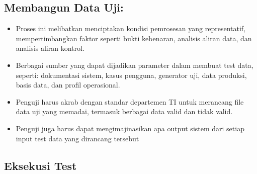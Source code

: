 \documentclass[12pt]{article}
\begin{document}
\subsection*{Membangun Data Uji:}
\begin{itemize}
   \item Proses ini melibatkan menciptakan kondisi pemrosesan yang representatif, mempertimbangkan faktor seperti bukti kebenaran, analisis aliran data, dan analisis aliran kontrol.
   \item Berbagai sumber yang dapat dijadikan parameter dalam membuat test data, seperti: dokumentasi sistem, kasus pengguna, generator uji, data produksi, basis data, dan profil operasional.
   \item Penguji harus akrab dengan standar departemen TI untuk merancang file data uji yang memadai, termasuk berbagai data valid dan tidak valid.
   \item Penguji juga harus dapat mengimajinasikan apa output sistem dari setiap input test data yang dirancang tersebut
\end{itemize}

\subsection*{Eksekusi Test}
\end{document}
